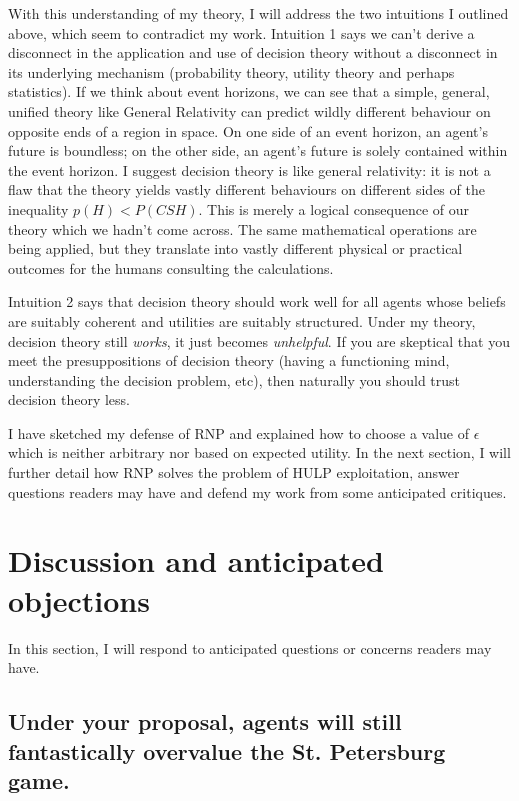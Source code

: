\documentclass{article}
\begin{document}
With this understanding of my theory, I will address the two intuitions I outlined above, which seem to contradict my work. Intuition 1 says we can't derive a disconnect in the application and use of decision theory without a disconnect in its underlying mechanism (probability theory, utility theory and perhaps statistics). If we think about event horizons, we can see that a simple, general, unified theory like General Relativity can predict wildly different behaviour on opposite ends of a region in space. On one side of an event horizon, an agent's future is boundless; on the other side, an agent's future is solely contained within the event horizon. I suggest decision theory is like general relativity: it is not a flaw that the theory yields vastly different behaviours on different sides of the inequality \(p(H)<P(CSH)\). This is merely a logical consequence of our theory which we hadn't come across. The same mathematical operations are being applied, but they translate into vastly different physical or practical outcomes for the humans consulting the calculations.

Intuition 2 says that decision theory should work well for all agents whose beliefs are suitably coherent and utilities are suitably structured. Under my theory, decision theory still \textit{works}, it just becomes \textit{unhelpful}. If you are skeptical that you meet the presuppositions of decision theory (having a functioning mind, understanding the decision problem, etc), then naturally you should trust decision theory less.

I have sketched my defense of RNP and explained how to choose a value of \(\epsilon\) which is neither arbitrary nor based on expected utility. In the next section, I will further detail how RNP solves the problem of HULP exploitation, answer questions readers may have and defend my work from some anticipated critiques. 

\section{Discussion and anticipated objections}

In this section, I will respond to anticipated questions or concerns readers may have. 

\subsection{Under your proposal, agents will still fantastically overvalue the St. Petersburg game.} 
\end{document}
